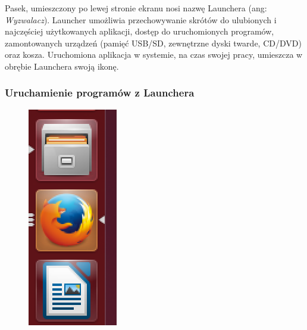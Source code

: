 Pasek, umieszczony po lewej stronie ekranu nosi nazwę Launchera (ang: \textit{Wyzwalacz}). Launcher umożliwia przechowywanie skrótów do ulubionych i najczęściej użytkowanych aplikacji, dostęp do uruchomionych programów, zamontowanych urządzeń (pamięć USB/SD, zewnętrzne dyski twarde, CD/DVD) oraz kosza. Uruchomiona aplikacja w systemie, na czas swojej pracy, umieszcza w obrębie Launchera swoją ikonę.

\subsubsection{Uruchamienie programów z Launchera}
\begin{figure}
                \includegraphics[width=\linewidth]{images/unity_launcher_programy.png}

\end{figure}
